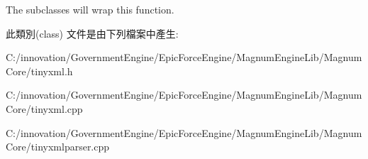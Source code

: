 The subclasses will wrap this function. 

此類別(class) 文件是由下列檔案中產生\+:\begin{DoxyCompactItemize}
\item 
C\+:/innovation/\+Government\+Engine/\+Epic\+Force\+Engine/\+Magnum\+Engine\+Lib/\+Magnum\+Core/tinyxml.\+h\item 
C\+:/innovation/\+Government\+Engine/\+Epic\+Force\+Engine/\+Magnum\+Engine\+Lib/\+Magnum\+Core/tinyxml.\+cpp\item 
C\+:/innovation/\+Government\+Engine/\+Epic\+Force\+Engine/\+Magnum\+Engine\+Lib/\+Magnum\+Core/tinyxmlparser.\+cpp\end{DoxyCompactItemize}
